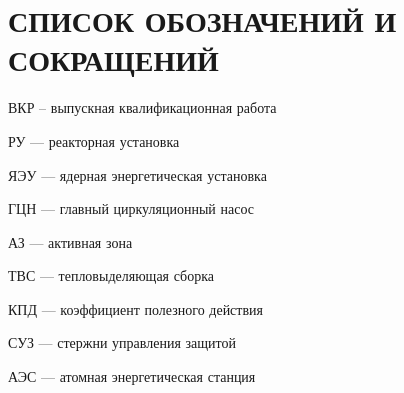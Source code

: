 \section*{СПИСОК ОБОЗНАЧЕНИЙ И СОКРАЩЕНИЙ}
%
\noindent ВКР – выпускная квалификационная работа

\noindent РУ — реакторная установка

\noindent ЯЭУ — ядерная энергетическая установка

\noindent ГЦН — главный циркуляционный насос

\noindent АЗ — активная зона

\noindent ТВС — тепловыделяющая сборка

\noindent КПД — коэффициент полезного действия

\noindent СУЗ — стержни управления защитой

\noindent АЭС — атомная энергетическая станция

